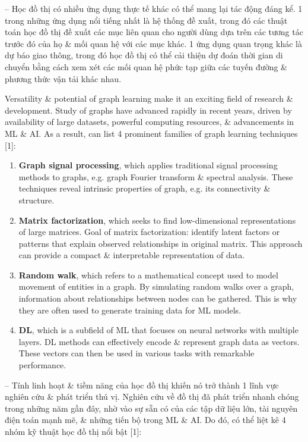 \documentclass{article}
\begin{document}
\begin{itemize}
\begin{itemize}
        -- Học đồ thị có nhiều ứng dụng thực tế khác có thể mang lại tác động đáng kể. 1 trong những ứng dụng nổi tiếng nhất là hệ thống đề xuất, trong đó các thuật toán học đồ thị đề xuất các mục liên quan cho người dùng dựa trên các tương tác trước đó của họ \& mối quan hệ với các mục khác. 1 ứng dụng quan trọng khác là dự báo giao thông, trong đó học đồ thị có thể cải thiện dự đoán thời gian di chuyển bằng cách xem xét các mối quan hệ phức tạp giữa các tuyến đường \& phương thức vận tải khác nhau.

        Versatility \& potential of graph learning make it an exciting field of research \& development. Study of graphs have advanced rapidly in recent years, driven by availability of large datasets, powerful computing resources, \& advancements in ML \& AI. As a result, can list 4 prominent families of graph learning techniques [1]:
        \begin{enumerate}
            \item {\bf Graph signal processing}, which applies traditional signal processing methods to graphs, e.g. graph Fourier transform \& spectral analysis. These techniques reveal intrinsic properties of graph, e.g. its connectivity \& structure.
            \item {\bf Matrix factorization}, which seeks to find low-dimensional representations of large matrices. Goal of matrix factorization: identify latent factors or patterns that explain observed relationships in original matrix. This approach can provide a compact \& interpretable representation of data.
            \item {\bf Random walk}, which refers to a mathematical concept used to model movement of entities in a graph. By simulating random walks over a graph, information about relationships between nodes can be gathered. This is why they are often used to generate training data for ML models.
            \item {\bf DL}, which is a subfield of ML that focuses on neural networks with multiple layers. DL methods can effectively encode \& represent graph data as vectors. These vectors can then be used in various tasks with remarkable performance.
        \end{enumerate}
        -- Tính linh hoạt \& tiềm năng của học đồ thị khiến nó trở thành 1 lĩnh vực nghiên cứu \& phát triển thú vị. Nghiên cứu về đồ thị đã phát triển nhanh chóng trong những năm gần đây, nhờ vào sự sẵn có của các tập dữ liệu lớn, tài nguyên điện toán mạnh mẽ, \& những tiến bộ trong ML \& AI. Do đó, có thể liệt kê 4 nhóm kỹ thuật học đồ thị nổi bật [1]:

\end{itemize}
\end{itemize}
\end{document}
